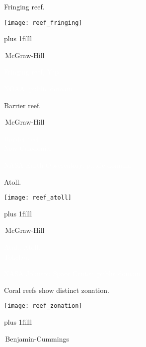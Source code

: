 \documentclass[t]{beamer}
\begin{document}
\begin{frame}[t]{Fringing reef.}

\texttt{[image: reef\_fringing]}

\vskip0pt plus 1filll

\tiny\textcopyright\,McGraw-Hill
\end{frame}


{
\begin{frame}[b]{\hfill\textcolor{white}{Fringing reef, Yap}}

\hfill\tiny\textcolor{white}{NOAA, public domain.}
\end{frame}
}

{
\begin{frame}[b]{Barrier reef.}

\tiny\hfill\textcopyright\,McGraw-Hill
\end{frame}
}

{
\begin{frame}[b]{\hfill\textcolor{white}{Barrier reef, \\\hfill New Caledonia.}}

\tiny\textcolor{white}{NASA Earth Observatory, public domain.}
\end{frame}
}

\begin{frame}[t]{Atoll.}

\texttt{[image: reef\_atoll]}

\vskip0pt plus 1filll

\tiny\textcopyright\,McGraw-Hill
\end{frame}

{
\begin{frame}[b]{\hfill\textcolor{white}{Atafu Atoll, \\\hfill Tokelau.}}

\tiny\textcolor{white}{NASA Johnson Space Center, public domain.}
\end{frame}
}

\begin{frame}[t]{Coral reefs show distinct zonation.}

\texttt{[image: reef\_zonation]}

\vskip0pt plus 1filll

\tiny\textcopyright\,Benjamin-Cummings
\end{frame}
\end{document}
